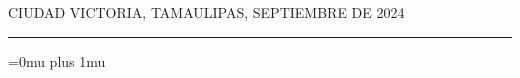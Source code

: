 \documentclass[12pt]{article}
\renewcommand{\listalgorithmname}{Lista de algoritmos}
\newcommand{\HRule}{\rule{\linewidth}{0.25mm}}
\newcommand{\fechaPortada}               {Septiembre de 2024}
\newcommand{\iemph}[1]{\MakeTextUppercase{#1}}
\begin{document}
\begin{flushright}
\iemph{Ciudad Victoria, Tamaulipas, \fechaPortada}
\end{flushright}
\HRule 
\clearpage
\ClearWallPaper
\pagestyle{fancy}
%
%
%
\clearpage
{}
\renewcommand\contentsname{Índice}
\tableofcontents


\clearpage
{}
\setcounter{page}{1}
%

\clearpage
%

\clearpage


\clearpage


\clearpage


\clearpage


\clearpage


\clearpage





\clearpage
\Urlmuskip=0mu plus 1mu\relax
{} 
\printbibliography
 
\end{document}
